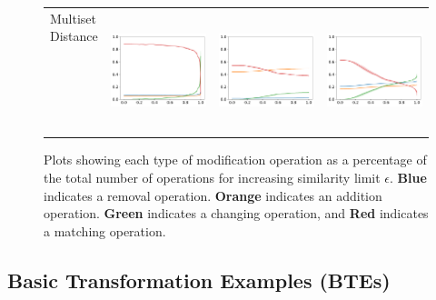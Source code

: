 \begin{figure}
{\begin{tabular}{lccc}
\shortstack{Multiset\\Distance\\\text{ }\\\text{ }\\\text{ }\\\text{ }\\\text{ }\\\text{ }}       & \includegraphics[width=.25\linewidth]{code/img/operation_count_ms_AT1.pdf}  & \includegraphics[width=.25\linewidth]{code/img/operation_count_ms_AT1-2.pdf}  & \includegraphics[width=.25\linewidth]{code/img/operation_count_ms_AT2.pdf}
\end{tabular}
}
\caption{Plots showing each type of modification operation as a percentage of the total number of operations for increasing similarity limit $\epsilon$. {\color{color1} \textbf{Blue}} indicates a removal operation. {\color{color2} \textbf{Orange}} indicates an addition operation. {\color{color3} \textbf{Green}} indicates a changing operation, and {\color{color4} \textbf{Red}} indicates a matching operation. }
\label{fig:operations}
\end{figure}





\subsection{Basic Transformation Examples (BTEs)}
\label{ssec:results-examples}

